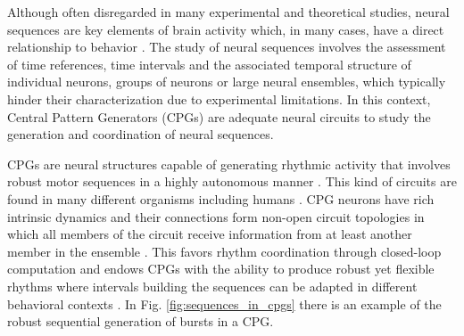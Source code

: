 Although often disregarded in many experimental and theoretical studies, neural sequences are key elements of brain activity which, in many cases, have a direct relationship to behavior \parencite{hahnloser_ultra-sparse_2002,venaille_synchronization_2005,buzsaki_space_2018,rabinovich_discrete_2018,paton_neural_2018,elices_robust_2019}.
The study of neural sequences involves the assessment of time references, time intervals and the associated temporal structure of individual neurons, groups of neurons or large neural ensembles, which typically hinder their characterization due to experimental limitations. In this context, Central Pattern Generators (CPGs) are adequate neural circuits to study the generation and coordination of neural sequences. 

CPGs are neural structures capable of generating rhythmic activity that involves robust motor sequences in a highly autonomous manner \parencite{hartline_mottor_1976,selverston_reliable_2000,marder_central_2001}. This kind of circuits are found in many different organisms including humans \parencite{dimitrijevic_evidence_1998,pavlidis_neonatal_2016, arichi_localization_2017}. CPG neurons have rich intrinsic dynamics and their connections form non-open circuit topologies in which all members of the circuit receive information from at least another member in the ensemble \cite{selverston_reliable_2000,huerta_topology_2001}. This favors rhythm coordination through closed-loop computation and endows CPGs with the ability to produce robust yet flexible rhythms where intervals building the sequences can be adapted in different behavioral contexts \parencite{elices_robust_2019}. %
In Fig. \ref{fig:sequences_in_cpgs} there is an example of the robust sequential generation of bursts in a CPG. 

